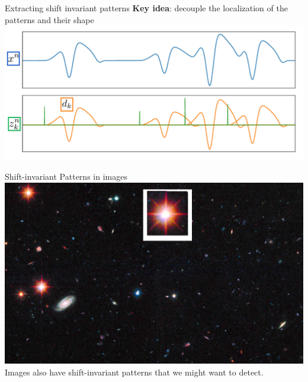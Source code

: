 \documentclass{beamer}
\begin{document}
\begin{frame}{Extracting shift invariant patterns}
\textbf{Key idea}: decouple the localization of the patterns and their shape
\includegraphics[width=\textwidth]{csc_explain_color.png}
\end{frame}


\begin{frame}{Shift-invariant Patterns in images}
\centering
\includegraphics[height=.7\textheight]{cosmostat}\\[1em]
Images also have shift-invariant patterns that we might want to detect.
\end{frame}
\end{document}
